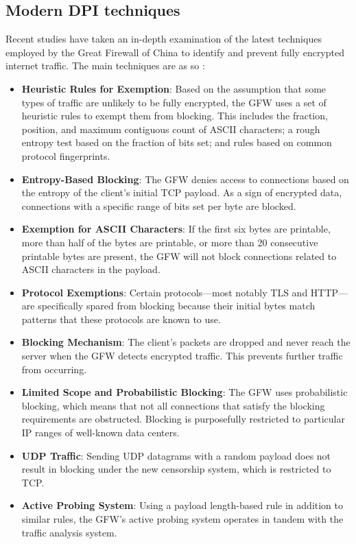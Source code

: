 \documentclass[12pt, fleqn, a4paper]{article}
\begin{document}
\subsection{Modern DPI techniques}
Recent studies have taken an in-depth examination of the latest techniques employed by the Great Firewall of China to identify and prevent fully encrypted internet traffic. The main techniques are as so \citep{gfw}:
\begin{itemize}
  \item \textbf{Heuristic Rules for Exemption}: Based on the assumption that some types of traffic are unlikely to be fully encrypted, the GFW uses a set of heuristic rules to exempt them from blocking. This includes the fraction, position, and maximum contiguous count of ASCII characters; a rough entropy test based on the fraction of bits set; and rules based on common protocol fingerprints.
  \item \textbf{Entropy-Based Blocking}: The GFW denies access to connections based on the entropy of the client's initial TCP payload. As a sign of encrypted data, connections with a specific range of bits set per byte are blocked.
  \item \textbf{Exemption for ASCII Characters}: If the first six bytes are printable, more than half of the bytes are printable, or more than 20 consecutive printable bytes are present, the GFW will not block connections related to ASCII characters in the payload.
  \item \textbf{Protocol Exemptions}: Certain protocols—most notably TLS and HTTP—are specifically spared from blocking because their initial bytes match patterns that these protocols are known to use.
  \item \textbf{Blocking Mechanism}: The client's packets are dropped and never reach the server when the GFW detects encrypted traffic. This prevents further traffic from occurring.
  \item \textbf{Limited Scope and Probabilistic Blocking}: The GFW uses probabilistic blocking, which means that not all connections that satisfy the blocking requirements are obstructed. Blocking is purposefully restricted to particular IP ranges of well-known data centers.
  \item \textbf{UDP Traffic}: Sending UDP datagrams with a random payload does not result in blocking under the new censorship system, which is restricted to TCP.
  \item \textbf{Active Probing System}: Using a payload length-based rule in addition to similar rules, the GFW's active probing system operates in tandem with the traffic analysis system.
\end{itemize}
\end{document}
